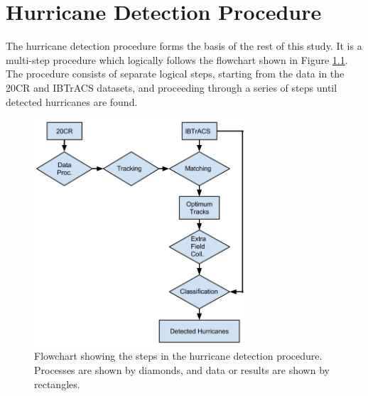 \documentclass[pdftex,12pt,a4paper]{report}
\begin{document}

\chapter{Hurricane Detection Procedure}
\label{chap:hurricane_detection_proc}


The hurricane detection procedure forms the basis of the rest of this study. It is a multi-step
procedure which logically follows the flowchart shown in Figure \ref{fig:hurricane_detection_proc}.
The procedure consists of separate logical steps, starting from the data in the 20CR and IBTrACS
datasets, and proceeding through a series of steps until detected hurricanes are found. 

\begin{figure}[ht!]
    \centering
    \includegraphics[width=0.7\textwidth]{figures/hurricane_detection_procedure}
    \caption{Flowchart showing the steps in the hurricane detection procedure. Processes are shown
    by diamonds, and data or results are shown by rectangles. }
    \label{fig:hurricane_detection_proc}
\end{figure}
\end{document}
